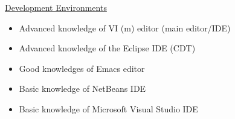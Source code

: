\documentclass[margin]{res}
\begin{document}
\begin{resume}
	\underline{Development Environments} %
		\begin{itemize}
			\item Advanced knowledge of VI (m) editor (main editor/IDE)
			\item Advanced knowledge of the Eclipse IDE (CDT)
			\item Good knowledges of Emacs editor
			\item Basic knowledge of NetBeans IDE
			\item Basic knowledge of Microsoft Visual Studio IDE
		\end{itemize}





\end{resume}
\end{document}

